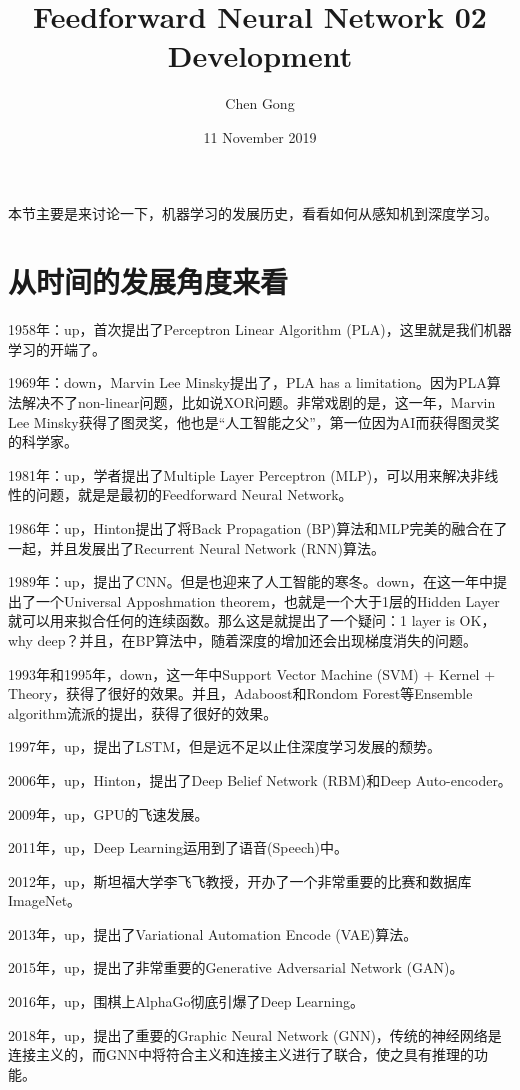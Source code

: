 \documentclass[a4paper]{article}
\title{Feedforward Neural Network 02 Development}
\author{Chen Gong}
\date{11 November 2019}
\begin{document}
\maketitle
本节主要是来讨论一下，机器学习的发展历史，看看如何从感知机到深度学习。
\section{从时间的发展角度来看}

1958年：up，首次提出了Perceptron Linear Algorithm (PLA)，这里就是我们机器学习的开端了。

1969年：down，Marvin Lee Minsky提出了，PLA has a limitation。因为PLA算法解决不了non-linear问题，比如说XOR问题。非常戏剧的是，这一年，Marvin Lee Minsky获得了图灵奖，他也是“人工智能之父”，第一位因为AI而获得图灵奖的科学家。

1981年：up，学者提出了Multiple Layer Perceptron (MLP)，可以用来解决非线性的问题，就是是最初的Feedforward Neural Network。

1986年：up，Hinton提出了将Back Propagation (BP)算法和MLP完美的融合在了一起，并且发展出了Recurrent Neural Network (RNN)算法。

1989年：up，提出了CNN。但是也迎来了人工智能的寒冬。down，在这一年中提出了一个Universal Apposhmation theorem，也就是一个大于1层的Hidden Layer就可以用来拟合任何的连续函数。那么这是就提出了一个疑问：1 layer is OK，why deep？并且，在BP算法中，随着深度的增加还会出现梯度消失的问题。

1993年和1995年，down，这一年中Support Vector Machine (SVM) + Kernel + Theory，获得了很好的效果。并且，Adaboost和Rondom Forest等Ensemble algorithm流派的提出，获得了很好的效果。

1997年，up，提出了LSTM，但是远不足以止住深度学习发展的颓势。

2006年，up，Hinton，提出了Deep Belief Network (RBM)和Deep Auto-encoder。

2009年，up，GPU的飞速发展。

2011年，up，Deep Learning运用到了语音(Speech)中。

2012年，up，斯坦福大学李飞飞教授，开办了一个非常重要的比赛和数据库ImageNet。

2013年，up，提出了Variational Automation Encode (VAE)算法。

2015年，up，提出了非常重要的Generative Adversarial Network (GAN)。

2016年，up，围棋上AlphaGo彻底引爆了Deep Learning。

2018年，up，提出了重要的Graphic Neural Network (GNN)，传统的神经网络是连接主义的，而GNN中将符合主义和连接主义进行了联合，使之具有推理的功能。
\end{document}
